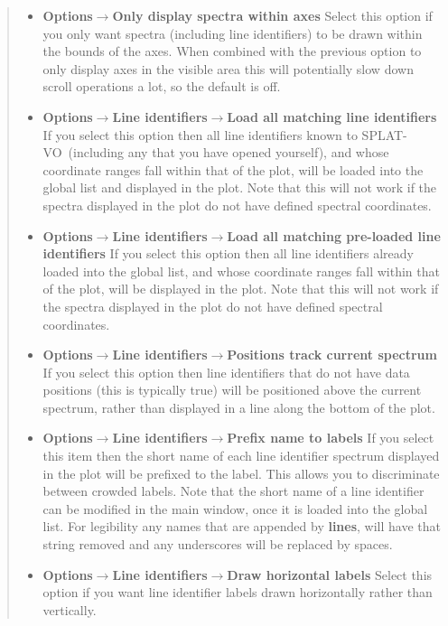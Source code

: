 \documentclass[twoside,11pt]{article}
\newcommand{\latexhtml}[2]{#1}
\renewcommand{\_}{\texttt{\symbol{95}}}
\newcommand{\SPLAT}{\textsf{SPLAT-VO}}
\newcommand{\submenuitem}[2]{\latexhtml{\textbf{#1$\rightarrow$#2}}{\textbf{#1->#2}}}
\newcommand{\subsubmenuitem}[3]{\latexhtml{\textbf{#1$\rightarrow$#2$\rightarrow$#3}}{\textbf{#1->#2->#3}}}
\newcommand{\labelitem}[1]{\textbf{#1}}
\begin{document}
\begin{quote}
\begin{itemize}
  \item \submenuitem{Options}{Only display spectra within axes}
  Select this option if you only want spectra (including line identifiers) to
  be drawn within the bounds of the axes. When combined with the previous
  option to only display axes in the visible area this will potentially slow
  down scroll operations a lot, so the default is off.

  \item \subsubmenuitem{Options}{Line identifiers}{Load all matching line identifiers}
  If you select this option then all line identifiers known to \SPLAT\
  (including any that you have opened yourself), and whose coordinate ranges
  fall within that of the plot, will be loaded into the global list and
  displayed in the plot. Note that this will not work if the spectra displayed
  in the plot do not have defined spectral coordinates.

  \item \subsubmenuitem{Options}{Line identifiers}{Load all matching pre-loaded line identifiers}
  If you select this option then all line identifiers already loaded into the
  global list, and whose coordinate ranges fall within that of the plot, will
  be displayed in the plot. Note that this will not work if the spectra
  displayed in the plot do not have defined spectral coordinates.

  \item \subsubmenuitem{Options}{Line identifiers}{Positions track current spectrum}
  If you select this option then line identifiers that do not have data
  positions (this is typically true) will be positioned above the current
  spectrum, rather than displayed in a line along the bottom of the plot.

  \item \subsubmenuitem{Options}{Line identifiers}{Prefix name to labels}
  If you select this item then the short name of each line identifier spectrum
  displayed in the plot will be prefixed to the label. This allows you to
  discriminate between crowded labels. Note that the short name of a line
  identifier can be modified in the main window, once it is loaded into the
  global list. For legibility any names that are appended by
  \labelitem{\_lines}, will have that string removed and any underscores will
  be replaced by spaces.

  \item \subsubmenuitem{Options}{Line identifiers}{Draw horizontal labels}
  Select this option if you want line identifier labels drawn horizontally
  rather than vertically.


\end{itemize}
\end{quote}
\end{document}
